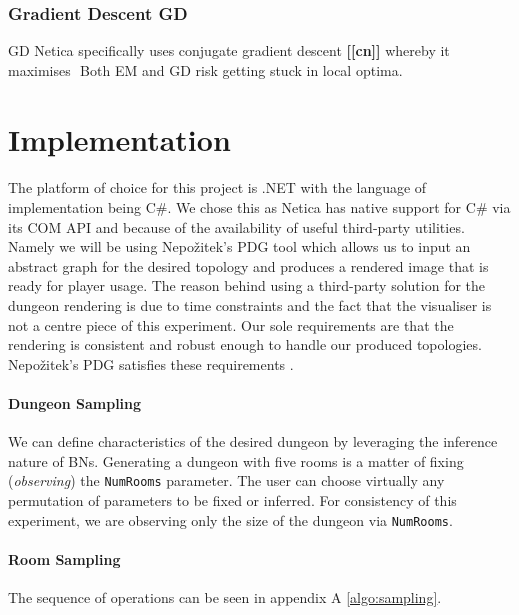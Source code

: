 \documentclass{UoYCSproject}
\begin{document}
\subsubsection{Gradient Descent GD}
GD Netica specifically uses conjugate gradient descent \textbf{[[cn]]} whereby it maximises \(\)
Both EM and GD risk getting stuck in local optima.

\section{Implementation}
\label{sec:implementation}
\paragraph{}
The platform of choice for this project is .NET with the language of implementation being C\#. We chose this as Netica has native support for C\# via its COM API and because of the availability of useful third-party utilities. Namely we will be using Nepo\v{z}itek's PDG tool \parencite{levelGenerator} which allows us to input an abstract graph for the desired topology and produces a rendered image that is ready for player usage. The reason behind using a third-party solution for the dungeon rendering is due to time constraints and the fact that the visualiser is not a centre piece of this experiment. Our sole requirements are that the rendering is consistent and robust enough to handle our produced topologies. Nepo\v{z}itek's PDG satisfies these requirements \parencite{Nepozitek2018FASTCT}.
\paragraph{Dungeon Sampling} %
We can define characteristics of the desired dungeon by leveraging the inference nature of BNs. Generating a dungeon with five rooms is a matter of fixing (\textit{observing}) the \texttt{NumRooms} parameter. The user can choose virtually any permutation of parameters to be fixed or inferred. For consistency of this experiment, we are observing only the size of the dungeon via \texttt{NumRooms}.

\paragraph{Room Sampling}
The sequence of operations can be seen in appendix A \ref{algo:sampling}.
\end{document}
